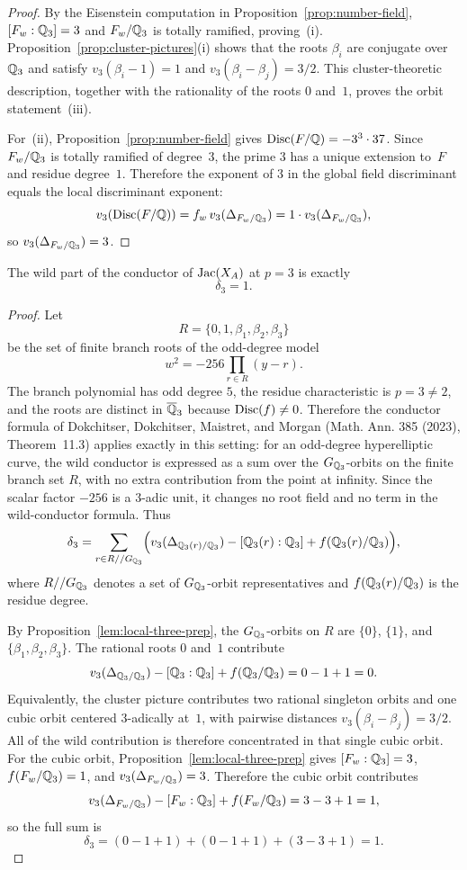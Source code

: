 \begin{proof}
By the Eisenstein computation in Proposition~\ref{prop:number-field}, \([F_w:\mathbb{Q}_3]=3\) and \(F_w/\mathbb{Q}_3\) is totally ramified, proving~(i). Proposition~\ref{prop:cluster-pictures}(i) shows that the roots \(\beta_i\) are conjugate over~\(\mathbb{Q}_3\) and satisfy \(v_3(\beta_i-1)=1\) and \(v_3(\beta_i-\beta_j)=3/2\). This cluster-theoretic description, together with the rationality of the roots \(0\) and~\(1\), proves the orbit statement~(iii).

For~(ii), Proposition~\ref{prop:number-field} gives \(\operatorname{Disc}(F/\mathbb{Q})=-3^3\cdot 37\). Since \(F_w/\mathbb{Q}_3\) is totally ramified of degree~\(3\), the prime \(3\) has a unique extension to~\(F\) and residue degree~\(1\). Therefore the exponent of \(3\) in the global field discriminant equals the local discriminant exponent:
\[
v_3(\operatorname{Disc}(F/\mathbb{Q}))=f_w\,v_3(\Delta_{F_w/\mathbb{Q}_3})=1\cdot v_3(\Delta_{F_w/\mathbb{Q}_3}),
\]
so \(v_3(\Delta_{F_w/\mathbb{Q}_3})=3\).
\end{proof}

\begin{theorem}\label{thm:conductor-exact}
The wild part of the conductor of \(\operatorname{Jac}(X_A)\) at \(p=3\) is exactly
\[
\delta_3=1.
\]
\end{theorem}

\begin{proof}
Let
\[
R=\{0,1,\beta_1,\beta_2,\beta_3\}
\]
be the set of finite branch roots of the odd-degree model
\[
w^2=-256\prod_{r\in R}(y-r).
\]
The branch polynomial has odd degree \(5\), the residue characteristic is \(p=3\neq 2\), and the roots are distinct in \(\overline{\mathbb{Q}}_3\) because \(\operatorname{Disc}(f)\neq 0\). Therefore the conductor formula of Dokchitser, Dokchitser, Maistret, and Morgan (Math. Ann. 385 (2023), Theorem~11.3) applies exactly in this setting: for an odd-degree hyperelliptic curve, the wild conductor is expressed as a sum over the \(G_{\mathbb{Q}_3}\)-orbits on the finite branch set \(R\), with no extra contribution from the point at infinity. Since the scalar factor \(-256\) is a \(3\)-adic unit, it changes no root field and no term in the wild-conductor formula. Thus
\[
\delta_3=\sum_{r\in R//G_{\mathbb{Q}_3}}
\Bigl(v_3(\Delta_{\mathbb{Q}_3(r)/\mathbb{Q}_3})-[\mathbb{Q}_3(r):\mathbb{Q}_3]+f(\mathbb{Q}_3(r)/\mathbb{Q}_3)\Bigr),
\]
where \(R//G_{\mathbb{Q}_3}\) denotes a set of \(G_{\mathbb{Q}_3}\)-orbit representatives and \(f(\mathbb{Q}_3(r)/\mathbb{Q}_3)\) is the residue degree.

By Proposition~\ref{lem:local-three-prep}, the \(G_{\mathbb{Q}_3}\)-orbits on \(R\) are \(\{0\}\), \(\{1\}\), and \(\{\beta_1,\beta_2,\beta_3\}\). The rational roots \(0\) and~\(1\) contribute
\[
v_3(\Delta_{\mathbb{Q}_3/\mathbb{Q}_3})-[\mathbb{Q}_3:\mathbb{Q}_3]+f(\mathbb{Q}_3/\mathbb{Q}_3)=0-1+1=0.
\]
Equivalently, the cluster picture contributes two rational singleton orbits and one cubic orbit centered \(3\)-adically at~\(1\), with pairwise distances \(v_3(\beta_i-\beta_j)=3/2\). All of the wild contribution is therefore concentrated in that single cubic orbit.
For the cubic orbit, Proposition~\ref{lem:local-three-prep} gives \([F_w:\mathbb{Q}_3]=3\), \(f(F_w/\mathbb{Q}_3)=1\), and \(v_3(\Delta_{F_w/\mathbb{Q}_3})=3\).
Therefore the cubic orbit contributes
\[
v_3(\Delta_{F_w/\mathbb{Q}_3})-[F_w:\mathbb{Q}_3]+f(F_w/\mathbb{Q}_3)=3-3+1=1,
\]
so the full sum is
\[
\delta_3=(0-1+1)+(0-1+1)+(3-3+1)=1.
\]
\end{proof}

